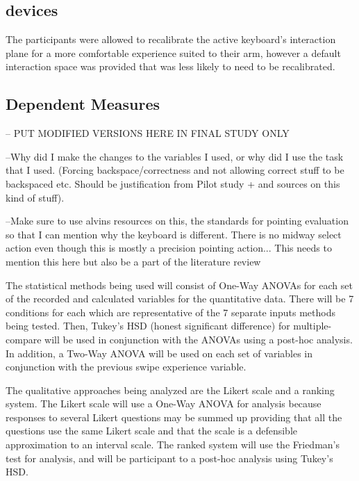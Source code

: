 \subsection{devices}

The participants were allowed to recalibrate the active keyboard's interaction plane for a more comfortable experience suited to their arm, however a default interaction space was provided that was less likely to need to be recalibrated.

\subsection{Dependent Measures}

-- PUT MODIFIED VERSIONS HERE IN FINAL STUDY ONLY

--Why did I make the changes to the variables I used, or why did I use the task that I used. (Forcing backspace/correctness and not allowing correct stuff to be backspaced etc. Should be justification from Pilot study + and sources on this kind of stuff).

--Make sure to use alvins resources on this, the standards for pointing evaluation so that I can mention why the keyboard is different. There is no midway select action even though this is mostly a precision pointing action... This needs to mention this here but also be a part of the literature review

The statistical methods being used will consist of One-Way ANOVAs for each set of the recorded and calculated variables for the quantitative data. There will be 7 conditions for each which are representative of the 7 separate inputs methods being tested. Then, Tukey's HSD (honest significant difference) for multiple-compare will be used in conjunction with the ANOVAs using a post-hoc analysis. In addition, a Two-Way ANOVA will be used on each set of variables in conjunction with the previous swipe experience variable.

The qualitative approaches being analyzed are the Likert scale and a ranking system. The Likert scale will use a One-Way ANOVA for analysis because responses to several Likert questions may be summed up providing that all the questions use the same Likert scale and that the scale is a defensible approximation to an interval scale. The ranked system will use the Friedman's test for analysis, and will be participant to a post-hoc analysis using Tukey's HSD.







